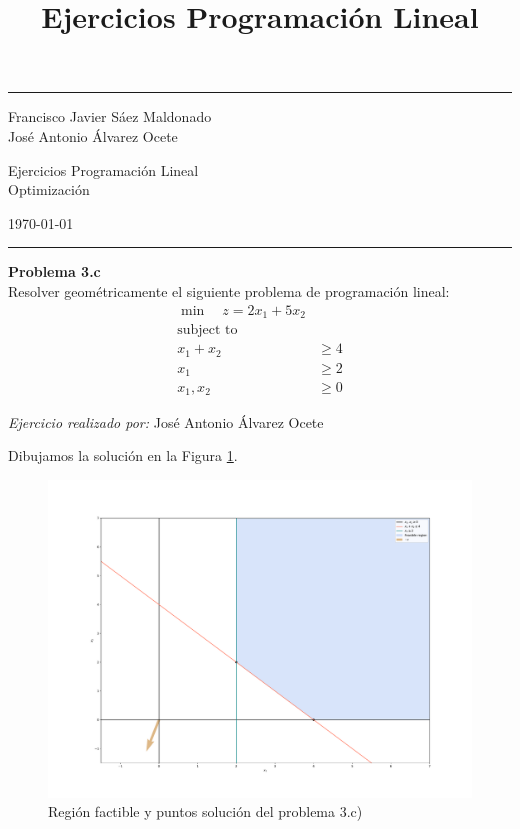 \documentclass[11pt,table]{article}
\title{Ejercicios Programación Lineal}
\newenvironment{problem}[2][Problema]
    { \begin{mdframed}[backgroundcolor=gray!20] \textbf{#1 #2} \\}
    {  \end{mdframed}}
\begin{document}
    

\fancyhead[C]{}
\hrule \medskip %
\begin{minipage}{0.295\textwidth}
\raggedright
\footnotesize
Francisco Javier Sáez Maldonado \hfill\\
José Antonio Álvarez Ocete \hfill\\
\end{minipage}
\begin{minipage}{0.4\textwidth}
\centering
\large
Ejercicios Programación Lineal\\
\normalsize
Optimización\\
\end{minipage}
\begin{minipage}{0.295\textwidth}
\raggedleft
\today\hfill\\
\end{minipage}
\medskip\hrule
\bigskip


    
\begin{problem}{3.c}
Resolver geométricamente el siguiente problema de programación lineal:
\begin{align*}
\min \quad z  = 2x_1 + 5x_2\\
\text{subject to} \\
x_1 + x_2 & \geq 4 \\
x_1 & \geq 2\\
x_1,x_2 & \geq 0
\end{align*}
    \end{problem}

\emph{Ejercicio realizado por:} José Antonio Álvarez Ocete


Dibujamos la solución en la Figura \ref{fig:ej3c}.

\begin{figure}
    \centering  
    \includegraphics[scale=0.8]{figures/Ej3c}
    \caption{Región factible y puntos solución del problema 3.c)}
    \label{fig:ej3c}
\end{figure}
\end{document}
